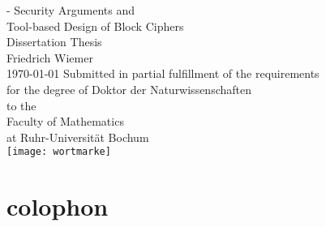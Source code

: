 \thispagestyle{empty}
{
    \calccentering{\unitlength}
    \begin{adjustwidth*}{\unitlength}{-\unitlength}
        \raggedleft{}
        {\Huge\color{Burgundy}%
        Security Arguments and\\
        Tool-based Design of Block Ciphers}\\[\baselineskip]
        {\LARGE%
        Dissertation Thesis}\\[0.2\textheight]
        {\huge%
        Friedrich Wiemer}\\[\baselineskip]
        {\LARGE%
        \today}
        \vfill
        \vfill
        {\large%
        Submitted in partial fulfillment of the requirements\\
        for the degree of Doktor der Naturwissenschaften\\[\baselineskip]%

        to the\\[\baselineskip]

        Faculty of Mathematics\\
        at Ruhr-Universität Bochum\\[2\baselineskip]


        \vfill
        }
        {\texttt{[image: wortmarke]}}
        \vspace*{\baselineskip}
    \end{adjustwidth*}
}

\clearpage{}

\thispagestyle{empty}
\hphantom{.}
\vfill
\section*{colophon}

